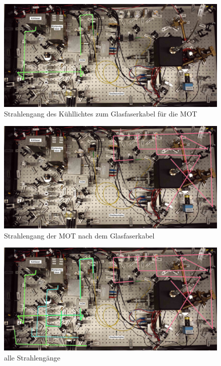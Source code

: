 \documentclass[
class=book,
accentcolor=1b,
custommargins=geometry,
fontsize=11pt,
thesis={type=Versuchsanleitung},
ruledheaders=all,
headline=false,
instbox=false,
marginpar=false,
title=small,
ignore-missing-data=true,
twoside=false,
logofile=apqdesign/tuda_logo.pdf,
pdfa=false %
]{apqpub}
\begin{document}
					\begin{figure}[htb!]
						\centering
						\includegraphics[width=\textwidth]{graphics/SZM.jpg}
						\caption{Strahlengang des  \textcolor[cmyk]{0.6,0,1,0}{Kühllichtes zum Glasfaserkabel} für die MOT}
						\label{fig:SZM}
					\end{figure}					
					\begin{figure}[htb!]
						\centering
						\includegraphics[width=\textwidth]{graphics/MOTSTG.jpg}
						\caption{Strahlengang \textcolor[cmyk]{0,0.96,0.55,0}{der MOT} nach dem Glasfaserkabel}
						\label{fig:MOTSTG}
					\end{figure}
					\begin{figure}[htb!]
						\centering
						\includegraphics[width=\textwidth]{graphics/STGK.jpg}
						\caption{alle Strahlengänge}
						\label{fig:STGK}
					\end{figure}
					
\end{document}
